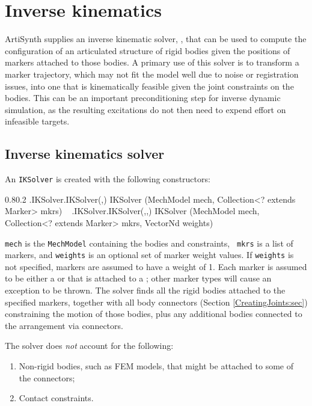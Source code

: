 \section{Inverse kinematics}
\label{InverseKinematics:sec}

ArtiSynth supplies an inverse kinematic solver, ,
that can be used to compute the configuration of an articulated structure of
rigid bodies given the positions of markers attached to those bodies.  A
primary use of this solver is to transform a marker trajectory, which may not
fit the model well due to noise or registration issues, into one that is
kinematically feasible given the joint constraints on the bodies. This can be
an important preconditioning step for inverse dynamic simulation, as the
resulting excitations do not then need to expend effort on infeasible
targets.

\subsection{Inverse kinematics solver}
\label{InverseKinematicsSolver:sec}

An {\tt IKSolver} is created with the following constructors:
%
\begin{methodtable}{0.8}{0.2}
%
\methodentry
{\probes.IKSolver.IKSolver(,)}%
{IKSolver (MechModel mech, Collection<? extends Marker> mkrs)}%
{\ }%
%
\methodentry
{\probes.IKSolver.IKSolver(,,)}%
{IKSolver (MechModel mech, Collection<? extends Marker> mkrs, VectorNd weights)}%
{\ }%
%
\end{methodtable}
%
{\tt mech} is the {\tt MechModel} containing the bodies and constraints, {\tt
mkrs} is a list of markers, and {\tt weights} is an optional set of marker
weight values. If {\tt weights} is not specified, markers are assumed to have a
weight of 1. Each marker is assumed to be either
a  or  that is
attached to a ; other marker types will cause an
exception to be thrown.
The solver finds all the rigid bodies attached to the specified markers,
together with all body connectors (Section \ref{CreatingJoints:sec})
constraining the motion of those bodies, plus any additional bodies connected
to the arrangement via connectors. 

\begin{sideblock}
The solver does {\it not} account for the following:
\begin{enumerate}

\item Non-rigid bodies, such as FEM models, that might be attached
to some of the connectors;

\item Contact constraints.

\end{enumerate}
\end{sideblock}

